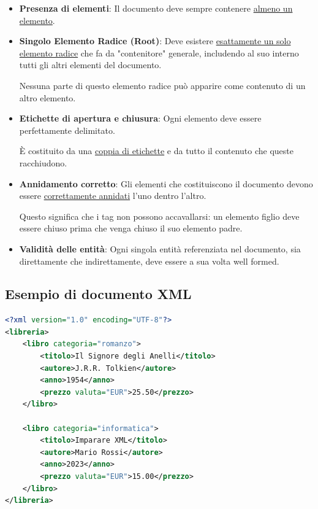 \begin{itemize}
    \item \textbf{Presenza di elementi}: Il documento deve sempre contenere \uline{almeno un elemento}.
    \item \textbf{Singolo Elemento Radice (Root)}: Deve esistere \uline{esattamente un solo elemento radice} che fa da "contenitore" generale, includendo al suo interno tutti gli altri elementi del documento.

    Nessuna parte di questo elemento radice può apparire come contenuto di un altro elemento.
    \item \textbf{Etichette di apertura e chiusura}: Ogni elemento deve essere perfettamente delimitato.

    È costituito da una \uline{coppia di etichette} e da tutto il contenuto che queste racchiudono.
    \item \textbf{Annidamento corretto}: Gli elementi che costituiscono il documento devono essere \uline{correttamente annidati} l'uno dentro l'altro.

    Questo significa che i tag non possono accavallarsi: un elemento figlio deve essere chiuso prima che venga chiuso il suo elemento padre.
    \item \textbf{Validità delle entità}: Ogni singola entità referenziata nel documento, sia direttamente che indirettamente, deve essere a sua volta well formed.
\end{itemize}

\subsection{Esempio di documento XML}

\begin{tcolorbox}[title=Esempio di documento XML Well-formed]
\begin{lstlisting}[language=XML]
<?xml version="1.0" encoding="UTF-8"?>
<libreria>
    <libro categoria="romanzo">
        <titolo>Il Signore degli Anelli</titolo>
        <autore>J.R.R. Tolkien</autore>
        <anno>1954</anno>
        <prezzo valuta="EUR">25.50</prezzo>
    </libro>
    
    <libro categoria="informatica">
        <titolo>Imparare XML</titolo>
        <autore>Mario Rossi</autore>
        <anno>2023</anno>
        <prezzo valuta="EUR">15.00</prezzo>
    </libro>
</libreria>
\end{lstlisting}  
\end{tcolorbox}

